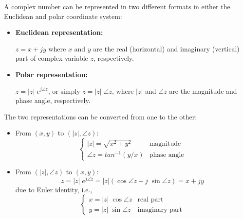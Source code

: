 \documentclass{article}
\begin{document}
A complex number can be represented in two different formats in either
the Euclidean and polar coordinate system:
\begin{itemize}
\item {\bf Euclidean representation:} 

  $z=x+jy$ where $x$ and $y$ are the real (horizontal) and imaginary 
  (vertical) part of complex variable $z$, respectively.
\item {\bf Polar representation:} 

  $z = |z|\;e^{j\angle z}$, or simply $z=|z|\;\angle z$, where $|z|$ and
  $\angle z$ are the magnitude and phase angle, respectively.
\end{itemize}


The two representations can be converted from one to the other:
\begin{itemize}
\item From $(x,y)$ to $(|z|,\angle z)$:
  \begin{equation}
    \left\{ \begin{array}{ll} |z|=\sqrt{x^2+y^2} & \mbox{magnitude}\\
      \angle z=tan^{-1} (y/x) & \mbox{phase angle}
    \end{array} \right. 
  \end{equation}
\item From $(|z|,\angle z)$ to $(x,y)$:
  \begin{equation} 
    z=|z|\;e^{j\angle z}=|z|(\cos\angle z+j\;\sin\angle z)=x+jy 
  \end{equation}
  due to Euler identity, i.e.,
  \begin{equation}
    \left\{ \begin{array}{ll} x=|z|\;\cos\angle z & \mbox{real part}\\
      y=|z|\;\sin\angle z & \mbox{imaginary part}
    \end{array} \right. 
  \end{equation}
\end{itemize}
\end{document}

